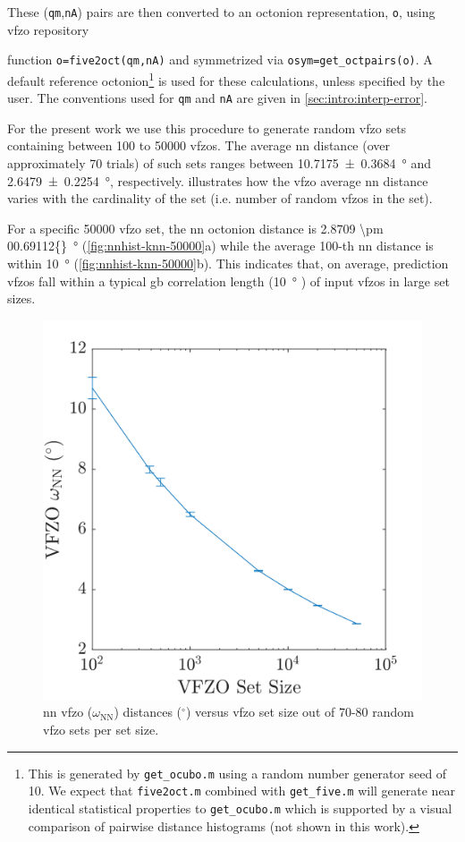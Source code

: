 \documentclass[final,twocolumn,12pt]{elsarticle}
\newcommand{\inpt}{input}
\newcommand{\outpt}{prediction}
\newcommand{\vfzorepo}{\gls{vfzo} repository}
\newcommand{\nnomega}{2.8709 \pm 00.69112}
\begin{document}
These (\texttt{qm},\texttt{nA}) pairs are then converted to an octonion representation, \texttt{o}, using \vfzorepo{ function \texttt{o=five2oct(qm,nA)} and symmetrized via \texttt{osym=get\_octpairs(o)}. A default reference octonion\footnote{This is generated by \texttt{get\_ocubo.m} using a random number generator seed of 10. We expect that \texttt{five2oct.m} combined with \texttt{get\_five.m} will generate near identical statistical properties to \texttt{get\_ocubo.m} which is supported by a visual comparison of pairwise distance histograms (not shown in this work).} is used for these calculations, unless specified by the user. The conventions used for \texttt{qm} and \texttt{nA} are given in \cref{sec:intro:interp-error}.

For the present work we use this procedure to generate random \gls{vfzo} sets containing between \num{100} to \num{50000} \glspl{vfzo}. The average \gls{nn} distance (over approximately 70 trials) of such sets ranges between \SI{10.7175 \pm 0.3684}{\degree} and \SI{2.6479 \pm 0.2254}{\degree}, respectively.  illustrates how the \gls{vfzo} average \gls{nn} distance varies with the cardinality of the set (i.e. number of random \glspl{vfzo} in the set). 

For a specific \num{50000} \gls{vfzo} set, the \gls{nn} octonion distance is \SI{\nnomega{}}{\degree} (\cref{fig:nnhist-knn-50000}a) while the average 100-th \gls{nn} distance is within \SI{10}{\degree} (\cref{fig:nnhist-knn-50000}b). This indicates that, on average, \outpt{} \glspl{vfzo} fall within a typical \gls{gb} correlation length (\SI{10}{\degree} \cite{olmstedSurveyComputedGrain2009}) of \inpt{} \glspl{vfzo} in large set sizes.
\begin{figure}
    \centering
    \includegraphics[scale=1]{nndist-vs-setsize.png}
    \caption{\Gls{nn} \gls{vfzo} ($\omega_{\text{NN}}$) distances ($^{\circ}$) versus \gls{vfzo} set size out of 70-80 random \gls{vfzo} sets per set size.}
    \label{fig:nndist-vs-setsize}
\end{figure}

}
\end{document}
